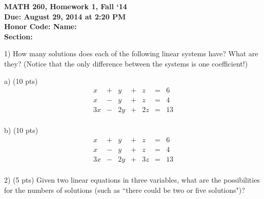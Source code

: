 \documentclass{article}
\begin{document}
\begin{flushleft}
	\bfseries{MATH 260, Homework 1, Fall `14}\\
	\bfseries{Due: August 29, 2014 at 2:20 PM}\\
	\bfseries{Honor Code:} \hspace{3.5in}\bfseries{Name:}\\
	\hspace{4.37in}\bfseries{Section:}
\end{flushleft}
\begin{flushleft}
\vspace{.25in}

1) How many solutions does each of the following linear systems have?  What are they?  (Notice that the only difference between the systems is one coefficient!)

\vspace{0.2in}

a) (10 pts)
\begin{equation*}
\begin{array}{ccccccr}
x  & + &  y & + &  z & = & 6\\
x  & - &  y & + &  z & = & 4\\
3x & - &  2y & + & 2z & = & 13\\
\end{array}
\end{equation*}

\vspace{2.5in}

b) (10 pts)
\begin{equation*}
\begin{array}{ccccccr}
x  & + &  y & + &  z & = & 6\\
x  & - &  y & + &  z & = & 4\\
3x & - & 2y & + & 3z & = & 13\\
\end{array}
\end{equation*}

\vspace{2.5in}

2) (5 pts) Given two linear equations in three variables, what are the possibilities for the numbers of solutions (such as ``there could be two or five solutions")?

\end{flushleft}
\end{document}
